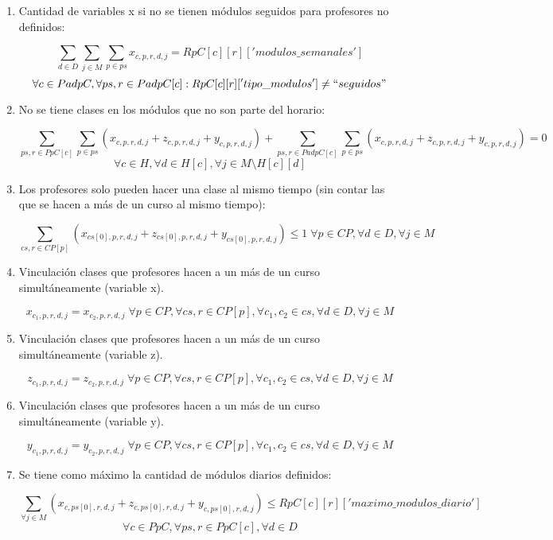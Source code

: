 \documentclass[letterpaper]{article}
\begin{document}
\begin{enumerate}
    \item Cantidad de variables x si no se tienen módulos seguidos para profesores no definidos:
    
    $$\sum_{d \in D} \sum_{j \in M} \sum_{p \in ps} x_{c,p,r,d,j} = RpC[c][r] ['modulos\_semanales'] $$
    $$\forall c \in PadpC, \forall ps,r \in PadpC[c] : RpC[c][r]['tipo\_modulos'] \neq ``seguidos"$$

    \item No se tiene clases en los módulos que no son parte del horario:

    $$\sum_{ps,r \in PpC[c]} \sum_{p \in ps} (x_{c,p,r,d,j} + z_{c,p,r,d,j} + y_{c,p,r,d,j}) + \sum_{ps,r \in PadpC[c]} \sum_{p \in ps} (x_{c,p,r,d,j} + z_{c,p,r,d,j} + y_{c,p,r,d,j}) = 0$$
    $$\forall c \in H, \forall d \in H[c], \forall j \in M \setminus H[c][d]$$

    \item Los profesores solo pueden hacer una clase al mismo tiempo (sin contar las que se hacen a más de un curso al mismo tiempo):

    $$\sum_{cs,r \in CP[p]} (x_{cs[0],p,r,d,j} + z_{cs[0],p,r,d,j} + y_{cs[0],p,r,d,j}) \leq 1 \; \forall p \in CP, \forall d \in D, \forall j \in M$$

    \item Vinculación clases que profesores hacen a un más de un curso simultáneamente (variable x).
    
    $$x_{c_1,p,r,d,j} = x_{c_2,p,r,d,j} \; \forall p \in CP, \forall cs,r \in CP[p], \forall c_1,c_2 \in cs, \forall d \in D, \forall j \in M$$

    \item Vinculación clases que profesores hacen a un más de un curso simultáneamente (variable z).
    
    $$z_{c_1,p,r,d,j} = z_{c_2,p,r,d,j} \; \forall p \in CP, \forall cs,r \in CP[p], \forall c_1,c_2 \in cs, \forall d \in D, \forall j \in M$$

    \item Vinculación clases que profesores hacen a un más de un curso simultáneamente (variable y).
    
    $$y_{c_1,p,r,d,j} = y_{c_2,p,r,d,j} \; \forall p \in CP, \forall cs,r \in CP[p], \forall c_1,c_2 \in cs, \forall d \in D, \forall j \in M$$

    \item Se tiene como máximo la cantidad de módulos diarios definidos:

    $$\sum_{\forall j \in M} (x_{c,ps[0],r,d,j} + z_{c,ps[0],r,d,j} + y_{c,ps[0],r,d,j}) \leq RpC[c][r]['maximo\_modulos\_diario']$$
    $$\forall c \in PpC, \forall ps,r \in PpC[c], \forall d \in D$$


\end{enumerate}
\end{document}

